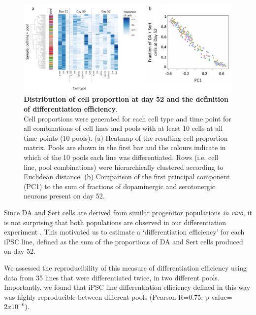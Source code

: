 \begin{figure}[h]
\centering
\includegraphics[width=15.5cm]{Chapter5/Fig/neuroseq_define_diff_efficiency.png}
\caption[Definition of differentiation efficiency]{\textbf{Distribution of cell proportion at day 52 and the definition of differentiation efficiency}.\\
Cell proportions were generated for each cell type and time point for all combinations of cell lines and pools with at least 10 cells at all time points (10 pools). 
(a) Heatmap of the resulting cell proportion matrix. 
Pools are shown in the first bar and the colours indicate in which of the 10 pools each line was differentiated. 
Rows (i.e. cell line, pool combinations) were hierarchically clustered according to Euclidean distance. 
(b) Comparison of the first principal component (PC1) to the sum of fractions of dopaminergic and serotonergic neurons present on day 52.}
\label{fig:neuroseq_diff_efficiency}
\end{figure}

Since DA and Sert cells are derived from similar progenitor populations \textit{in vivo}, it is not surprising that both populations are observed in our differentiation experiment \cite{ye1998fgf}. 
This motivated us to estimate a `differentiation efficiency' for each iPSC line, defined as the sum of the proportions of DA and Sert cells produced on day 52.

We assessed the reproducibility of this measure of differentiation efficiency using data from 35 lines that were differentiated twice, in two different pools. 
Importantly, we found that iPSC line differentiation efficiency defined in this way was highly reproducible between different pools (Pearson R=0.75; p value=$2x10^{-6}$).

